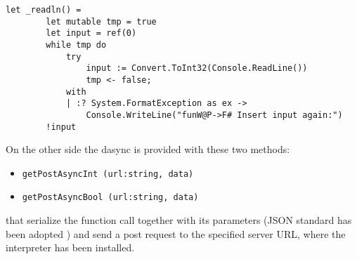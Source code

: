 \begin{lstlisting}[caption=All \fwap \texttt{readln()}'s are compiled into \fsharps \texttt{\_readln()}'s.]
let _readln() =
        let mutable tmp = true
        let input = ref(0)
        while tmp do
            try
                input := Convert.ToInt32(Console.ReadLine())
                tmp <- false;
            with
            | :? System.FormatException as ex ->
                Console.WriteLine("funW@P->F# Insert input again:")
        !input
\end{lstlisting}

On the other side the dasync is provided with these two methods:
\begin{itemize}
	\item \texttt{getPostAsyncInt (url:string, data)}
	\item \texttt{getPostAsyncBool (url:string, data)}
\end{itemize}

that serialize the function call together with its parameters (JSON standard has been adopted \cite{json}) and send a post request to the specified server URL, where the \fwap interpreter has been installed.
 

